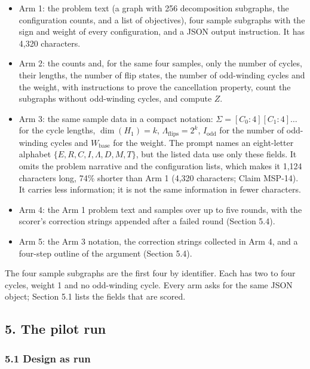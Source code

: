 \documentclass[
  11pt,
]{article}
\providecommand{\tightlist}{%
  \setlength{\itemsep}{0pt}\setlength{\parskip}{0pt}}
\begin{document}
\begin{itemize}
\tightlist
\item
  Arm 1: the problem text (a graph with 256 decomposition subgraphs, the
  configuration counts, and a list of objectives), four sample subgraphs
  with the sign and weight of every configuration, and a JSON output
  instruction. It has 4,320 characters.
\item
  Arm 2: the counts and, for the same four samples, only the number of
  cycles, their lengths, the number of flip states, the number of
  odd-winding cycles and the weight, with instructions to prove the
  cancellation property, count the subgraphs without odd-winding cycles,
  and compute \(Z\).
\item
  Arm 3: the same sample data in a compact notation:
  \(\Sigma = [C_0{:}4][C_1{:}4]\dots\) for the cycle lengths,
  \(\dim(H_1) = k\), \(\Lambda_{\mathrm{flips}} = 2^k\),
  \(I_{\mathrm{odd}}\) for the number of odd-winding cycles and
  \(W_{\mathrm{base}}\) for the weight. The prompt names an eight-letter
  alphabet \(\{E, R, C, I, \Lambda, D, M, T\}\), but the listed data use
  only these fields. It omits the problem narrative and the
  configuration lists, which makes it 1,124 characters long, 74\%
  shorter than Arm 1 (4,320 characters; Claim MSP-14). It carries less
  information; it is not the same information in fewer characters.
\item
  Arm 4: the Arm 1 problem text and samples over up to five rounds, with
  the scorer's correction strings appended after a failed round (Section
  5.4).
\item
  Arm 5: the Arm 3 notation, the correction strings collected in Arm 4,
  and a four-step outline of the argument (Section 5.4).
\end{itemize}

The four sample subgraphs are the first four by identifier. Each has two
to four cycles, weight 1 and no odd-winding cycle. Every arm asks for
the same JSON object; Section 5.1 lists the fields that are scored.

\subsection{5. The pilot run}\label{the-pilot-run}

\subsubsection{5.1 Design as run}\label{design-as-run}
\end{document}

